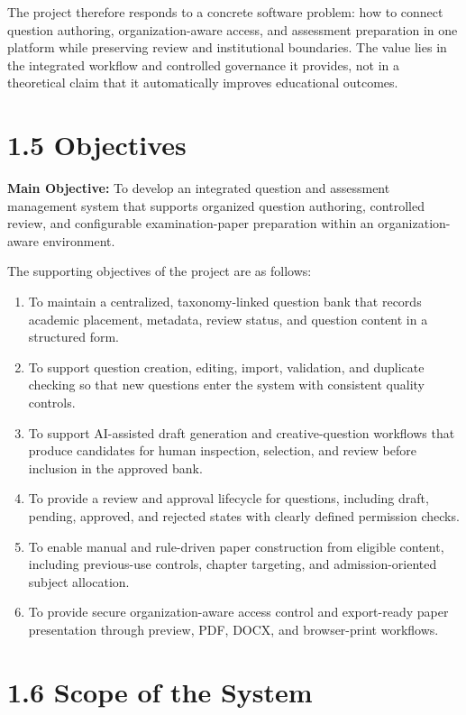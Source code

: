 The project therefore responds to a concrete software problem: how to connect question authoring, organization-aware access, and assessment preparation in one platform while preserving review and institutional boundaries. The value lies in the integrated workflow and controlled governance it provides, not in a theoretical claim that it automatically improves educational outcomes.

\section{1.5 Objectives}

\textbf{Main Objective:} To develop an integrated question and assessment management system that supports organized question authoring, controlled review, and configurable examination-paper preparation within an organization-aware environment.

The supporting objectives of the project are as follows:

\begin{enumerate}
    \item To maintain a centralized, taxonomy-linked question bank that records academic placement, metadata, review status, and question content in a structured form.
    \item To support question creation, editing, import, validation, and duplicate checking so that new questions enter the system with consistent quality controls.
    \item To support AI-assisted draft generation and creative-question workflows that produce candidates for human inspection, selection, and review before inclusion in the approved bank.
    \item To provide a review and approval lifecycle for questions, including draft, pending, approved, and rejected states with clearly defined permission checks.
    \item To enable manual and rule-driven paper construction from eligible content, including previous-use controls, chapter targeting, and admission-oriented subject allocation.
    \item To provide secure organization-aware access control and export-ready paper presentation through preview, PDF, DOCX, and browser-print workflows.
\end{enumerate}

\section{1.6 Scope of the System}

